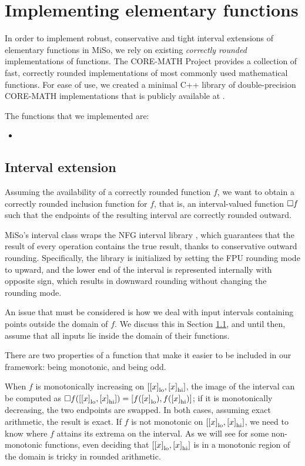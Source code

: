 
\section{Implementing elementary functions}
\label{sec:functions}
In order to implement robust, conservative and tight interval extensions of elementary functions in MiSo, we rely on existing \emph{correctly rounded} implementations of functions.
The CORE-MATH Project \cite{} provides a collection of fast, correctly rounded implementations of most commonly used mathematical functions.
For ease of use, we created a minimal C++ library of double-precision CORE-MATH implementations that is publicly available at \url{}.

The functions that we implemented are:
\begin{itemize}
	\item
\end{itemize}

\subsection{Interval extension}
Assuming the availability of a correctly rounded function $f$, we want to obtain a correctly rounded inclusion function for $f$, that is, an interval-valued function $\Box f$ such that the endpoints of the resulting interval are correctly rounded outward.

MiSo's interval class wraps the NFG interval library \cite{}, which guarantees that the result of every operation contains the true result, thanks to conservative outward rounding. Specifically, the library is initialized by setting the FPU rounding mode to upward, and the lower end of the interval is represented internally with opposite sign, which results in downward rounding without changing the rounding mode.

An issue that must be considered is how we deal with input intervals containing points outside the domain of $f$. We discuss this in Section \ref{}, and until then, assume that all inputs lie inside the domain of their functions.

There are two properties of a function that make it easier to be included in our framework: being monotonic, and being odd.

When $f$ is monotonically increasing on $[{[x]}_{\textrm{lo}}, {[x]}_{\textrm{hi}}]$, the image of the interval can be computed as $\Box f([{[x]}_{\textrm{lo}}, {[x]}_{\textrm{hi}}]) = [f({[x]}_{\textrm{lo}}), f({[x]}_{\textrm{hi}})]$; if it is monotonically decreasing, the two endpoints are swapped. In both cases, assuming exact arithmetic, the result is exact.
If $f$ is not monotonic on $[{[x]}_{\textrm{lo}}, {[x]}_{\textrm{hi}}]$, we need to know where $f$ attains its extrema on the interval. As we will see for some non-monotonic functions, even deciding that $[{[x]}_{\textrm{lo}}, {[x]}_{\textrm{hi}}]$ is in a monotonic region of the domain is tricky in rounded arithmetic.


